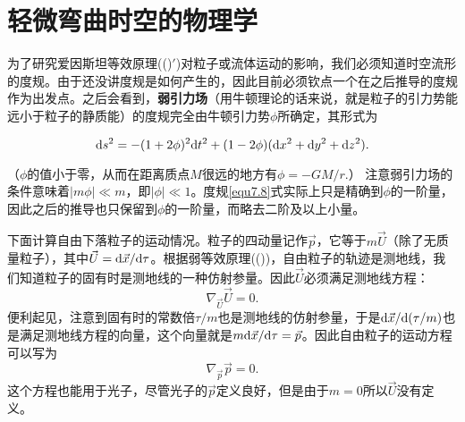\section{轻微弯曲时空的物理学}
\label{sec7.2}
为了研究爱因斯坦等效原理((\uppercase\expandafter{})$'$)对粒子或流体运动的影响，我们必须知道时空流形的度规。由于还没讲度规是如何产生的，因此目前必须钦点一个在之后推导的度规作为出发点。之后会看到，\textbf{弱引力场}（用牛顿理论的话来说，就是粒子的引力势能远小于粒子的静质能）的度规完全由牛顿引力势$\phi$所确定，其形式为
\begin{shaded}
\begin{equation}
    \mathrm{d} s^2 = -(1 + 2\phi)^2 \mathrm{d} t^2 + (1 - 2\phi) (\mathrm{d} x^2 + \mathrm{d} y^2 + \mathrm{d} z^2).
\label{equ7.8}
\end{equation}
\end{shaded}
（$\phi$的值小于零，从而在距离质点$M$很远的地方有$\phi = -GM / r$.） 注意弱引力场的条件意味着$|m \phi| \ll m$，即$|\phi| \ll 1$。度规\eqref{equ7.8}式实际上只是精确到$\phi$的一阶量，因此之后的推导也只保留到$\phi$的一阶量，而略去二阶及以上小量。

下面计算自由下落粒子的运动情况。粒子的四动量记作$\vec{p}$，它等于$m \vec{U}$（除了无质量粒子），其中$\vec{U} = \mathrm{d} \vec{x} / \mathrm{d} \tau$。根据弱等效原理((\uppercase\expandafter{}))，自由粒子的轨迹是测地线，我们知道粒子的固有时是测地线的一种仿射参量。因此$\vec{U}$必须满足测地线方程：
\begin{equation}
    \nabla_{\vec{U}} \vec{U} = 0.
\label{equ7.9}
\end{equation}
便利起见，注意到固有时的常数倍$\tau / m$也是测地线的仿射参量，于是$\mathrm{d} \vec{x} / \mathrm{d} (\tau/m)$也是满足测地线方程的向量，这个向量就是$m \mathrm{d} \vec{x} / \mathrm{d} \tau = \vec{p}$。因此自由粒子的运动方程可以写为
\begin{equation}
    \nabla_{\vec{p}} \vec{p} = 0.
\label{equ7.10}
\end{equation}
这个方程也能用于光子，尽管光子的$\vec{p}$定义良好，但是由于$m = 0$所以$\vec{U}$没有定义。

